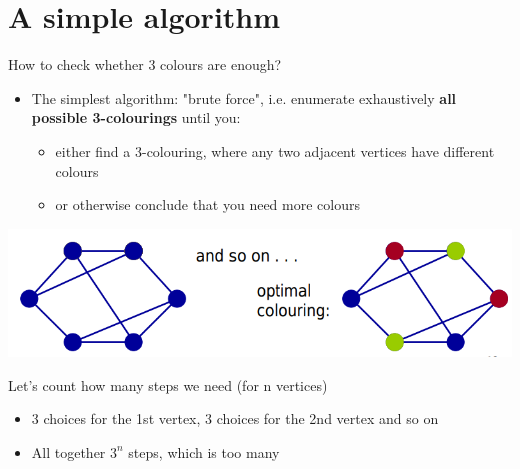 \documentclass{article}[18pt]
\begin{document}
\section{A simple algorithm}
How to check whether 3 colours are enough?
\begin{itemize}
\item The simplest algorithm: "brute force", i.e. enumerate exhaustively \textbf{all possible 3-colourings} until you:
\begin{itemize}
\item either find a 3-colouring, where any two adjacent vertices have different colours
\item or otherwise conclude that you need more colours
\end{itemize}
\end{itemize}
\begin{center}
\includegraphics[scale=0.7]{"brute force"}
\end{center}
Let's count how many steps we need (for n vertices)
\begin{itemize}
\item 3 choices for the 1st vertex, 3 choices for the 2nd vertex and so on
\item All together $3^n$ steps, which is too many
\end{itemize}
\end{document}

